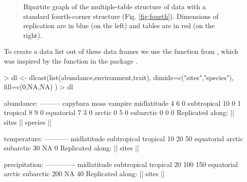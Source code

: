 \documentclass[a4paper]{report}
\numberwithin{exercise}{section}
\begin{document}
\begin{article}
\begin{figure}
\caption{Bipartite graph of the multiple-table structure of data with a standard fourth-corner structure (Fig. \ref{fig:fourth}).  Dimensions of replication are in blue (on the left) and tables are in red (on the right).}
\label{fig:bipartite}
\end{figure}

To create a data list out of these data frames we use the  function from , which was inspired by the  function in the  package \citep{Wickham2007}.
\begin{Schunk}
\begin{Sinput}
> dl <- dlcast(list(abundance,environment,trait),
 	dimids=c("sites","species"),
 	fill=c(0,NA,NA)
 )
> dl
\end{Sinput}
\begin{Soutput}
abundance:
---------
            capybara moss vampire
midlatitude        4    6       0
subtropical       10    0       1
tropical           8    9       0
equatorial         7    3       0
arctic             0    5       0
subarctic          0    0       0
Replicated along:  || sites || species || 


temperature:
-----------
midlatitude subtropical    tropical 
         10          20          50 
 equatorial      arctic   subarctic 
         30          NA           0 
Replicated along:  || sites || 


precipitation:
-------------
midlatitude subtropical    tropical 
         20         100         150 
 equatorial      arctic   subarctic 
        200          NA          40 
Replicated along:  || sites || 



\end{Soutput}
\end{Schunk}
\end{article}
\end{document}

